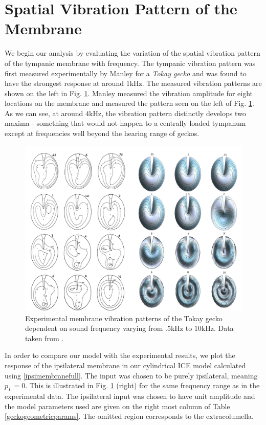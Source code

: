 \section{Spatial Vibration Pattern of the Membrane}\label{vibrationpatternchapter}
We begin our analysis by evaluating the variation of the spatial vibration pattern of the tympanic membrane
with frequency. The tympanic vibration pattern was first measured experimentally by Manley \cite{manleygecko1}
for a \textit{Tokay gecko} and was found to have the strongest response at around 1kHz. The measured vibration patterns
are shown on the left in Fig. \ref{manleygeckotympanum}. Manley measured the vibration amplitude for eight locations on the membrane and measured the pattern
seen on the left of Fig. \ref{manleygeckotympanum}. As we can see, at around $4$kHz, the vibration pattern
distinctly develops two maxima - something that would not happen to a centrally loaded tympanum except
at frequencies well beyond the hearing range of geckos.

\begin{figure}[ht!]
 \centering
 \includegraphics[width=1.0\linewidth]{Diagrams/manleymodelcomparison.png}
 \caption[Tokay gecko tympanum vibration profiles.]{Experimental membrane vibration patterns of the Tokay gecko dependent
 on sound frequency varying from $.5$kHz to $10$kHz. Data taken from \cite{manleygecko1}.}
  \label{manleygeckotympanum}
\end{figure}

In order to compare our model with the experimental results, we plot the response of the ipsilateral membrane in our cylindrical ICE model 
calculated using \eqref{ipsimembranefull}. The input was chosen to be purely ipsilateral, meaning $p_L=0$. 
This is illustrated in Fig. \ref{manleygeckotympanum} (right) for the same frequency range as in the experimental data. The ipsilateral input was chosen to have unit amplitude and the model parameters used are given
on the right most column of Table \ref{geckogeometricparams}. The omitted region corresponds to the extracolumella. 

